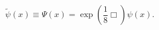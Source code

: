 \begin{equation}
\label{tilde-psi} \tilde{\psi}(x)\equiv\Psi (x)= \exp(\frac18
\Box)\psi(x).
\end{equation}

